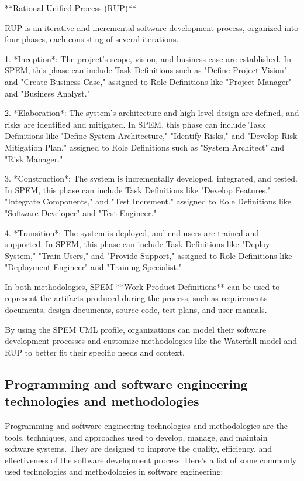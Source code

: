 \documentclass{article}
\begin{document}
**Rational Unified Process (RUP)**

RUP is an iterative and incremental software development process, organized into four phases, each consisting of several iterations.

1. *Inception*: The project's scope, vision, and business case are established. In SPEM, this phase can include Task Definitions such as "Define Project Vision" and "Create Business Case," assigned to Role Definitions like "Project Manager" and "Business Analyst."

2. *Elaboration*: The system's architecture and high-level design are defined, and risks are identified and mitigated. In SPEM, this phase can include Task Definitions like "Define System Architecture," "Identify Risks," and "Develop Risk Mitigation Plan," assigned to Role Definitions such as "System Architect" and "Risk Manager."

3. *Construction*: The system is incrementally developed, integrated, and tested. In SPEM, this phase can include Task Definitions like "Develop Features," "Integrate Components," and "Test Increment," assigned to Role Definitions like "Software Developer" and "Test Engineer."

4. *Transition*: The system is deployed, and end-users are trained and supported. In SPEM, this phase can include Task Definitions like "Deploy System," "Train Users," and "Provide Support," assigned to Role Definitions like "Deployment Engineer" and "Training Specialist."

In both methodologies, SPEM **Work Product Definitions** can be used to represent the artifacts produced during the process, such as requirements documents, design documents, source code, test plans, and user manuals. 

By using the SPEM UML profile, organizations can model their software development processes and customize methodologies like the Waterfall model and RUP to better fit their specific needs and context.


\subsection{Programming and software engineering technologies and methodologies}

Programming and software engineering technologies and methodologies are the tools, techniques, and approaches used to develop, manage, and maintain software systems. They are designed to improve the quality, efficiency, and effectiveness of the software development process. Here's a list of some commonly used technologies and methodologies in software engineering:
\end{document}
